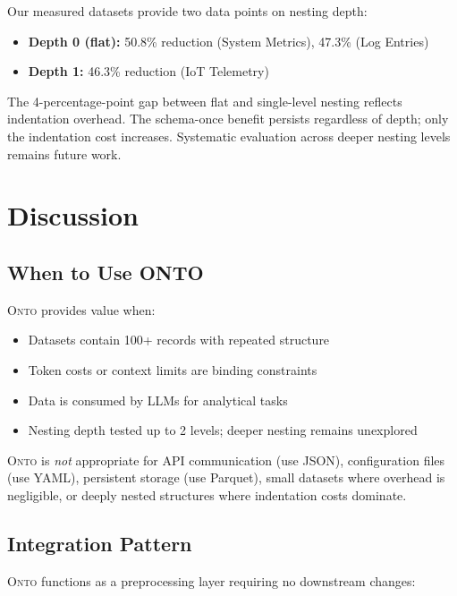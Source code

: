 \documentclass[10pt,twocolumn]{article}
\newcommand{\onto}{\textsc{Onto}\xspace}
\begin{document}
Our measured datasets provide two data points on nesting depth:

\begin{itemize}[leftmargin=*,itemsep=0.1em]
    \item \textbf{Depth 0 (flat):} 50.8\% reduction (System Metrics), 47.3\% (Log Entries)
    \item \textbf{Depth 1:} 46.3\% reduction (IoT Telemetry)
\end{itemize}

The 4-percentage-point gap between flat and single-level nesting reflects indentation overhead. The schema-once benefit persists regardless of depth; only the indentation cost increases. Systematic evaluation across deeper nesting levels remains future work.

\section{Discussion}

\subsection{When to Use ONTO}

\onto provides value when:
\begin{itemize}[leftmargin=*,itemsep=0.1em]
    \item Datasets contain 100+ records with repeated structure
    \item Token costs or context limits are binding constraints
    \item Data is consumed by LLMs for analytical tasks
    \item Nesting depth tested up to 2 levels; deeper nesting remains unexplored
\end{itemize}

\onto is \emph{not} appropriate for API communication (use JSON), configuration files (use YAML), persistent storage (use Parquet), small datasets where overhead is negligible, or deeply nested structures where indentation costs dominate.

\subsection{Integration Pattern}

\onto functions as a preprocessing layer requiring no downstream changes:
\end{document}

